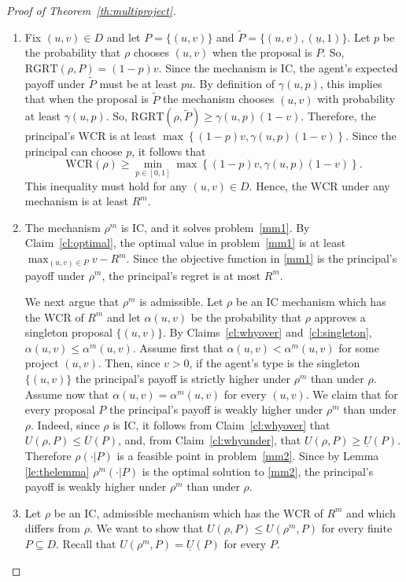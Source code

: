 \documentclass[12pt,english]{article}
\newcommand{\under}{\underline}
\newcommand{\overU}{{\overline{U}}}
\newcommand{\underU}{{\underline{U}}}
\theoremstyle{remark}
\newenvironment{proofof}[1]{\begin{proof}[Proof of #1]}{\end{proof}}
\theoremstyle{plain}
\theoremstyle{definition}
\newcommand{\rgrt}{\mathrm{RGRT}}
\newcommand{\wcr}{\mathrm{WCR}}
\begin{document}
\begin{proofof}{Theorem~\ref{th:multiproject}}
\begin{enumerate}
\vspace{-0.35cm} 
\item Fix $(u,v)\in D$ and let $P=\{(u,v)\}$ and $\tilde P=\{(u,v),(\under u,1)\}$.  Let $p$ be the probability that $\rho$ chooses $(u,v)$ when the proposal is $P$. So, $\rgrt(\rho,P)=(1-p)v$. Since the mechanism is IC, the agent's expected payoff under $\tilde P$ must be at least $pu$. By definition of $\gamma(u,p)$, this implies that when the proposal is $\tilde P$ the mechanism chooses $(u,v)$ with probability at least $\gamma(u,p)$. So, $\rgrt(\rho,\tilde P)\geqslant \gamma(u,p)(1-v)$. Therefore, the principal's $\wcr$ is at least $\max\left\{(1-p)v,  \gamma(u,p)(1-v)\right\}$. Since the principal can choose $p$, %
it follows that
$$
\wcr(\rho) \geqslant \min_{p \in [0,1]} \max \left\{(1-p)v,  \gamma(u,p)(1-v)\right\}.
$$
This inequality must hold for any $(u,v) \in D$. Hence, the $\wcr$ under any mechanism is at least $R^m$. 
\vspace{-0.35cm} \item The mechanism $\rho^m$ is IC, and it solves problem~\eqref{mm1}. By Claim~\ref{cl:optimal}, the optimal value in problem~\eqref{mm1} is at least $\max_{(u,v)\in P}v-R^m$. Since the objective function in \eqref{mm1} is the principal's payoff under $\rho^m$, the principal's regret is at most $R^m$.

We next argue that $\rho^m$ is admissible. Let $\rho$ be an IC mechanism which has the $\wcr$ of $R^m$ and let $\alpha(u,v)$ be the probability that $\rho$ approves a singleton proposal $\{(u,v)\}$. By Claims~\ref{cl:whyover} and~\ref{cl:singleton}, $\alpha(u,v)\leqslant\alpha^m(u,v)$. Assume first that $\alpha(u,v)<\alpha^m(u,v)$ for some project $(u,v)$. Then, since $v>0$, if the agent's type  is the  singleton $\{(u,v)\}$ the principal's payoff is strictly higher under $\rho^m$ than under $\rho$. Assume now that $\alpha(u,v)=\alpha^m(u,v)$ for every $(u,v)$. We claim that for every proposal $P$ the principal's payoff is weakly higher under $\rho^m$ than under $\rho$. Indeed, since $\rho$ is IC, it follows from Claim~\ref{cl:whyover} that $U(\rho,P)\leqslant \overU(P)$, and, from Claim~\ref{cl:whyunder}, that $U(\rho,P)\geqslant\underU(P)$. Therefore $\rho(\cdot|P)$ is a feasible point in problem~\eqref{mm2}. Since by Lemma \ref{le:thelemma} $\rho^m(\cdot|P)$ is the optimal solution to \eqref{mm2}, the principal's payoff is weakly higher under $\rho^m$ than under $\rho$.
\vspace{-0.35cm} \item Let $\rho$ be an IC, admissible mechanism which has the $\wcr$ of $R^m$ and which differs from $\rho$. We want to show that $U(\rho,P) \leqslant U(\rho^m,P)$ for every finite $P \subseteq D$. Recall that $U(\rho^m,P)=\underU(P)$ for every $P$. 


\end{enumerate}
\end{proofof}
\end{document}
